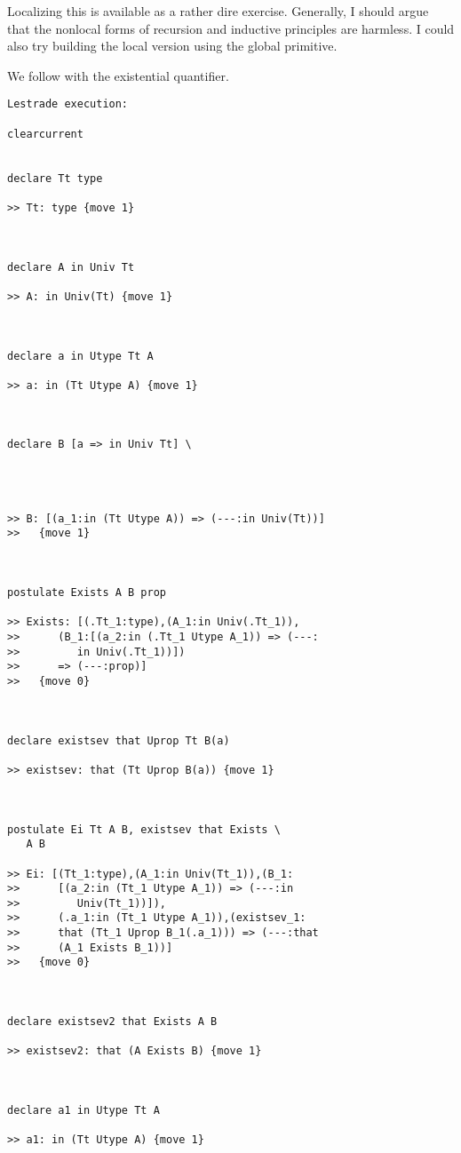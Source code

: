 \documentclass{article}
\begin{document}
Localizing this is available as a rather dire exercise.  Generally, I should argue that the nonlocal forms of recursion and inductive principles are harmless.
I could also try building the local version using the global primitive.

We follow with the existential quantifier.

\begin{verbatim}Lestrade execution:

clearcurrent


declare Tt type

>> Tt: type {move 1}



declare A in Univ Tt

>> A: in Univ(Tt) {move 1}



declare a in Utype Tt A

>> a: in (Tt Utype A) {move 1}



declare B [a => in Univ Tt] \
   



>> B: [(a_1:in (Tt Utype A)) => (---:in Univ(Tt))]
>>   {move 1}



postulate Exists A B prop

>> Exists: [(.Tt_1:type),(A_1:in Univ(.Tt_1)),
>>      (B_1:[(a_2:in (.Tt_1 Utype A_1)) => (---:
>>         in Univ(.Tt_1))])
>>      => (---:prop)]
>>   {move 0}



declare existsev that Uprop Tt B(a)

>> existsev: that (Tt Uprop B(a)) {move 1}



postulate Ei Tt A B, existsev that Exists \
   A B

>> Ei: [(Tt_1:type),(A_1:in Univ(Tt_1)),(B_1:
>>      [(a_2:in (Tt_1 Utype A_1)) => (---:in
>>         Univ(Tt_1))]),
>>      (.a_1:in (Tt_1 Utype A_1)),(existsev_1:
>>      that (Tt_1 Uprop B_1(.a_1))) => (---:that
>>      (A_1 Exists B_1))]
>>   {move 0}



declare existsev2 that Exists A B

>> existsev2: that (A Exists B) {move 1}



declare a1 in Utype Tt A

>> a1: in (Tt Utype A) {move 1}




\end{verbatim}
\end{document}
